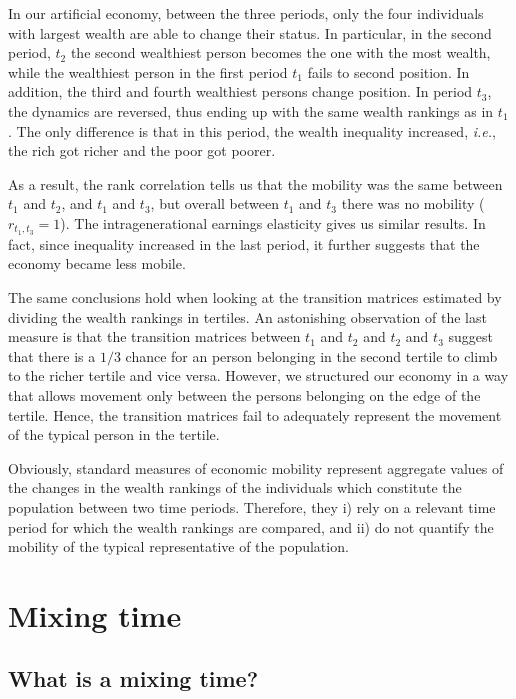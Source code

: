 \documentclass[11pt]{article}
\newcommand{\ie}{{\it i.e.}\xspace}
\numberwithin{equation}{section}
\begin{document}
In our artificial economy, between the three periods, only the four individuals with largest wealth are able to change their status. In particular, in the second period, $t_2$ the second wealthiest person becomes the one with the most wealth, while the wealthiest person in the first period $t_1$ fails to second position. In addition, the third and fourth wealthiest persons change position. In period $t_3$, the dynamics are reversed, thus ending up with the same wealth rankings as in $t_1$. The only difference is that in this period, the wealth inequality increased, \ie, the rich got richer and the poor got poorer. 

As a result, the rank correlation tells us that the mobility was the same between $t_1$ and $t_2$, and $t_1$ and $t_3$, but overall between $t_1$ and $t_3$ there was no mobility ($r_{t_1,t_3} = 1$). The intragenerational earnings elasticity gives us similar results. In fact, since inequality increased in the last period, it further suggests that the economy became less mobile. 

The same conclusions hold when looking at the transition matrices estimated by dividing the wealth rankings in tertiles. An astonishing observation of the last measure is that the transition matrices between $t_1$ and $t_2$ and $t_2$ and $t_3$ suggest that there is a $1/3$ chance for an person belonging in the second tertile to climb to the richer tertile and vice versa. However, we structured our economy in a way that allows movement only between the persons belonging on the edge of the tertile. Hence, the transition matrices fail to adequately represent the movement of the typical person in the tertile.

Obviously, standard measures of economic mobility represent aggregate values of the changes in the wealth rankings of the individuals which constitute the population between two time periods. Therefore, they i) rely on a relevant time period for which the wealth rankings are compared, and ii) do not quantify the mobility of the typical representative of the population.

\section{Mixing time}

\subsection{What is a mixing time?}\label{sec:what}
\end{document}
